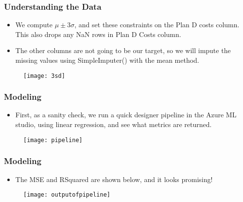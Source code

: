 \documentclass{beamer}
\begin{document}
\begin{frame}

\frametitle{Understanding the Data}

\begin{itemize}

\item We compute $\mu \pm 3\sigma$, and set these constraints on the Plan D costs column. This also drops any NaN rows in Plan D Costs column.

\item The other columns are not going to be our target, so we will impute the missing values using SimpleImputer() with the mean method. 

\end{itemize}

\begin{figure}
\texttt{[image: 3sd]}
\end{figure}



\end{frame}


\begin{frame}

\frametitle{Modeling}

\begin{itemize}

\item First, as a sanity check, we run a quick designer pipeline in the Azure ML studio, using linear regression, and see what metrics are returned.
\end{itemize}

\begin{figure}
\texttt{[image: pipeline]}
\end{figure}


\end{frame}


\begin{frame}

\frametitle{Modeling}

\begin{itemize}

\item The MSE and RSquared are shown below, and it looks promising!

\end{itemize}

\begin{figure}
\texttt{[image: outputofpipeline]}
\end{figure}



\end{frame}
\end{document}
